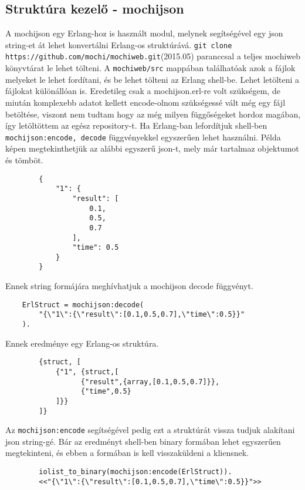 \subsection{Struktúra kezelő - mochijson \label{subsec:mochijson}}
	A mochijson \cite{mochijson} egy Erlang-hoz is használt modul, melynek segítségével egy json string-et át lehet konvertálni Erlang-os struktúrává. \newline 
	\texttt{git clone https://github.com/mochi/mochiweb.git}(2015.05)
	paranccsal a teljes mochiweb könyvtárat le lehet tölteni. A \texttt{mochiweb/src} mappában találhatóak azok a fájlok melyeket le lehet fordítani, és be lehet tölteni az Erlang shell-be. Lehet letölteni a fájlokat különállóan is. \newline
	Eredetileg csak a mochijson.erl-re volt szükségem, de miután komplexebb adatot kellett encode-olnom szükségessé vált még egy fájl betöltése, viszont nem tudtam hogy az még milyen függőségeket hordoz magában, így letöltöttem az egész repository-t. \newline
	Ha Erlang-ban lefordítjuk shell-ben \texttt{mochijson:encode, decode} függvényekkel egyszerűen lehet használni.\newline 
	Példa képen megtekinthetjük az alábbi egyszerű json-t, mely már tartalmaz objektumot és tömböt.
	\begin{verbatim}
		{
		    "1": {
		        "result": [
		            0.1,
		            0.5,
		            0.7
		        ],
		        "time": 0.5
		    }
		}
	\end{verbatim}
	Ennek string formájára meghívhatjuk a mochijson decode függvényt.
	\begin{verbatim}
	ErlStruct = mochijson:decode(
	    "{\"1\":{\"result\":[0.1,0.5,0.7],\"time\":0.5}}"
	).
	\end{verbatim}
	Ennek eredménye egy Erlang-os struktúra.
	\begin{verbatim}
		{struct, [
		    {"1", {struct,[
		          {"result",{array,[0.1,0.5,0.7]}},
		          {"time",0.5}
		    ]}}
		]}
	\end{verbatim}
	Az \texttt{mochijson:encode} segítségével pedig ezt a struktúrát vissza tudjuk alakítani json string-gé. Bár az eredményt shell-ben binary formában lehet egyszerűen megtekinteni, és ebben a formában is kell visszaküldeni a kliensnek. 
	\begin{verbatim}
		iolist_to_binary(mochijson:encode(ErlStruct)).
		<<"{\"1\":{\"result\":[0.1,0.5,0.7],\"time\":0.5}}">>
	\end{verbatim}


